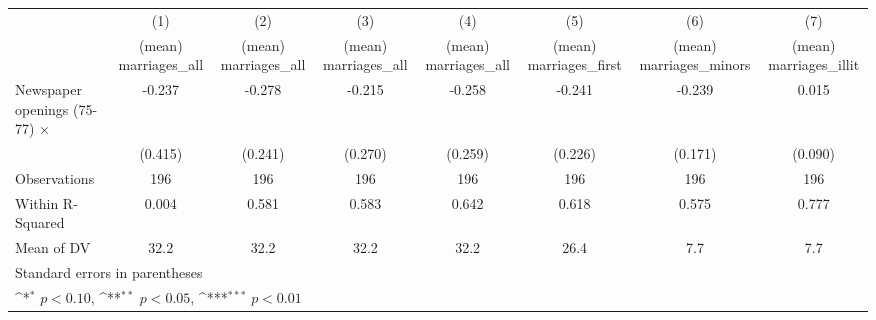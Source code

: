 {
\def\sym#1{\ifmmode^{#1}\else\(^{#1}\)\fi}
\begin{tabular}{l*{7}{c}}
\hline\hline
                    &\multicolumn{1}{c}{(1)}&\multicolumn{1}{c}{(2)}&\multicolumn{1}{c}{(3)}&\multicolumn{1}{c}{(4)}&\multicolumn{1}{c}{(5)}&\multicolumn{1}{c}{(6)}&\multicolumn{1}{c}{(7)}\\
                    &\multicolumn{1}{c}{(mean) marriages\_all}&\multicolumn{1}{c}{(mean) marriages\_all}&\multicolumn{1}{c}{(mean) marriages\_all}&\multicolumn{1}{c}{(mean) marriages\_all}&\multicolumn{1}{c}{(mean) marriages\_first}&\multicolumn{1}{c}{(mean) marriages\_minors}&\multicolumn{1}{c}{(mean) marriages\_illit}\\
\hline
Newspaper openings (75-77) $\times$ \multicolumn{1}{r}{1878-1882 period}&      -0.237         &      -0.278         &      -0.215         &      -0.258         &      -0.241         &      -0.239         &       0.015         \\
                    &     (0.415)         &     (0.241)         &     (0.270)         &     (0.259)         &     (0.226)         &     (0.171)         &     (0.090)         \\
\hline
Observations        &         196         &         196         &         196         &         196         &         196         &         196         &         196         \\
Within R-Squared    &       0.004         &       0.581         &       0.583         &       0.642         &       0.618         &       0.575         &       0.777         \\
Mean of DV          &        32.2         &        32.2         &        32.2         &        32.2         &        26.4         &         7.7         &         7.7         \\
\hline\hline
\multicolumn{8}{l}{\footnotesize Standard errors in parentheses}\\
\multicolumn{8}{l}{\footnotesize \sym{*} \(p<0.10\), \sym{**} \(p<0.05\), \sym{***} \(p<0.01\)}\\
\end{tabular}
}
